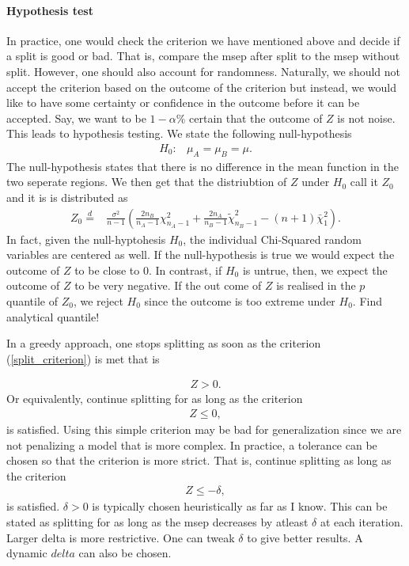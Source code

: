 \documentclass{article}
\theoremstyle{definition}
\theoremstyle{remark}
\newcommand{\eqdis}{\stackrel{d}{=}}
\begin{document}
\paragraph{Hypothesis test}
In practice, one would check the criterion we have mentioned above and decide if
a split is good or bad. That is, compare the msep after split to the msep without
split. However,
one should also account for randomness. Naturally, we
should not accept the criterion based on the outcome of the criterion but instead,
we would like to have some certainty or confidence in the
outcome before it can be accepted. Say, we want to be $ 1-\alpha\% $ certain that the outcome of $ Z $ is not
noise. This leads to hypothesis testing. We state the following null-hypothesis
\begin{align*}
	H_0: & \mu_A = \mu_B = \mu.
\end{align*}
The null-hypothesis states that there is no difference in the mean function in
the two seperate regions. We then get that the distriubtion of $ Z $ under $ H_0$
call it $ Z_0 $ and it is is distributed as
\begin{align*}
	Z_0 \eqdis & \frac{\sigma^2}{n-1} \left(
	\frac{2 n_B}{n_A -1} \chi^2_{n_A -1}
	+ \frac{2 n_A}{n_B -1} \tilde \chi^2_{n_B -1}
	- (n+1) \bar \chi_1^2
	\right).
\end{align*}
In fact, given the null-hyptohesis $ H_0 $, the individual Chi-Squared random variables are
centered as well. If the null-hypothesis is true we would expect the outcome of $ Z $ to be
close to $ 0 $. In contrast, if $ H_0 $ is untrue, then, we expect the
outcome of $ Z $ to be very negative. If the out come of $ Z $ is realised in the $p$ quantile of $ Z_0 $, we reject $ H_0 $ since the outcome is too extreme
under $ H_0 $. Find analytical quantile!

In a greedy approach, one stops splitting as soon as the criterion
(\ref{split_criterion}) is met that is

\begin{align*}
	Z > 0.
\end{align*}
Or equivalently, continue splitting for as long as the criterion
\begin{align*}
	Z \leq 0,
\end{align*}
is satisfied. Using this simple criterion may be bad for generalization since we are
not penalizing a model that is more complex. In practice, a tolerance can be
chosen so that the criterion is more strict. That is, continue splitting as
long as the criterion
\begin{align*}
	Z \leq -\delta,
\end{align*}
is satisfied. $ \delta>0 $ is typically chosen heuristically as far as I know.
This can be stated as splitting for as long as the msep decreases by atleast $
	\delta $ at each iteration. Larger delta is more restrictive. One can tweak
$ \delta $ to give better results. A dynamic $ delta $ can also be chosen.
\end{document}
